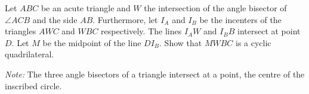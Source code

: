 Let $ABC$ be an acute triangle and $W$ the intersection of the angle bisector of $\angle ACB$ and the side $AB$. Furthermore, let $I_A$ and $I_B$ be the incenters of the triangles $AWC$ and $WBC$ respectively. The lines $I_AW$ and $I_BB$ intersect at point $D$. Let $M$ be the midpoint of the line $DI_B$.
Show that $MWBC$ is a cyclic quadrilateral.

\emph{Note:} The three angle bisectors of a triangle intersect at a point, the centre of the inscribed circle.
